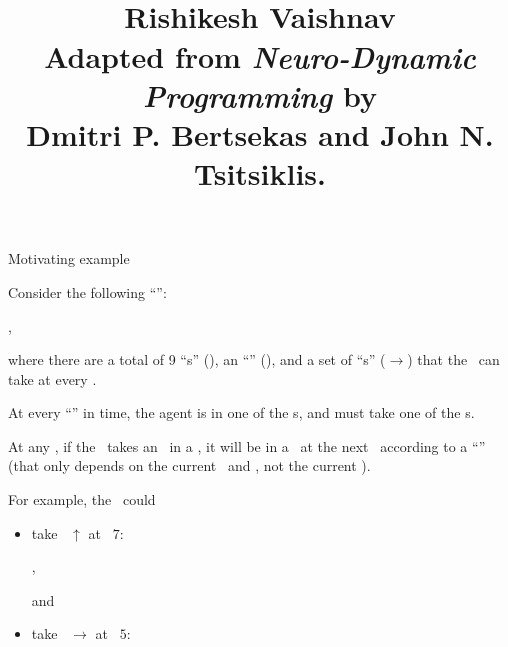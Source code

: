 \documentclass{rl_theory/rl_theory}
\begin{document}
\title{
\\
\vspace{10pt}
\large 
Rishikesh Vaishnav\\ 
\vspace{10pt}
\normalsize 
Adapted from
{\it Neuro-Dynamic Programming}
by \\
Dmitri P. Bertsekas
and
John N. Tsitsiklis.
}
\maketitle
\begin{part} {Motivating example}
  
  

  Consider the following ``\brd'':\\
  \begin{center}
    ,
  \end{center}
  where there are a total of 9 ``\til{}s'' (), 
  an ``\agt'' (), and
  a set of ``\act{}s'' ($\rightarrow$) that the \agt\ can take at every \til.

  At every ``\stp'' in time, the agent is in one of the \til{}s,
  and must take one of the \act{}s. 

  At any \stp, if the \agt\ takes an \act\ in a \til, 
  it will be in a \til\ at the next \stp\ according to a ``\trd''
  (that only depends on the current \til\ and \act, not the current \stp).

  For example, the \agt\ could
  \begin{itemize}
    \def\tilesep{3.2}
    \def\tscale{0.6}
    \item take \act\ $\uparrow$ at \til\ $7$:
      \begin{center}
        ,
      \end{center}
      and
    \item take \act\ $\rightarrow$ at \til\ $5$:
      \begin{center}
\end{center}
\end{itemize}
\end{part}
\end{document}
